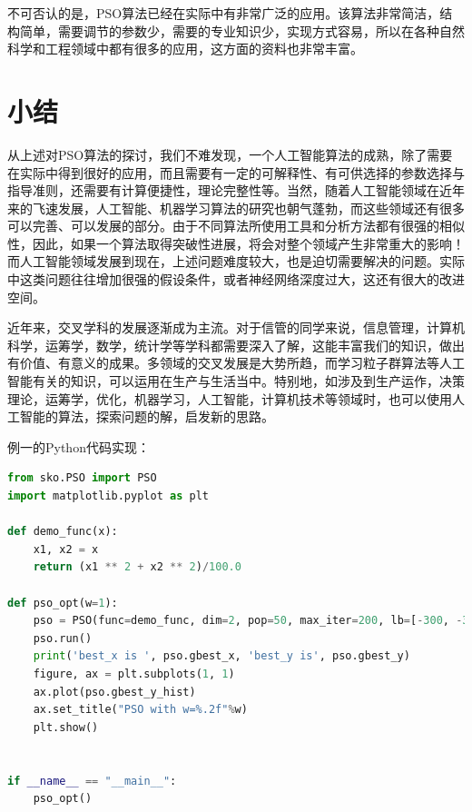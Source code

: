 \documentclass[lang=cn,12pt,a4paper,cite=authoryear]{elegantpaper}
\begin{document}
不可否认的是，PSO算法已经在实际中有非常广泛的应用。该算法非常简洁，结构简单，需要调节的参数少，需要的专业知识少，实现方式容易，所以在各种自然科学和工程领域中都有很多的应用，这方面的资料也非常丰富。

\section{小结}

从上述对PSO算法的探讨，我们不难发现，一个人工智能算法的成熟，除了需要在实际中得到很好的应用，而且需要有一定的可解释性、有可供选择的参数选择与指导准则，还需要有计算便捷性，理论完整性等。当然，随着人工智能领域在近年来的飞速发展，人工智能、机器学习算法的研究也朝气蓬勃，而这些领域还有很多可以完善、可以发展的部分。由于不同算法所使用工具和分析方法都有很强的相似性，因此，如果一个算法取得突破性进展，将会对整个领域产生非常重大的影响！而人工智能领域发展到现在，上述问题难度较大，也是迫切需要解决的问题。实际中这类问题往往增加很强的假设条件，或者神经网络深度过大，这还有很大的改进空间。

近年来，交叉学科的发展逐渐成为主流。对于信管的同学来说，信息管理，计算机科学，运筹学，数学，统计学等学科都需要深入了解，这能丰富我们的知识，做出有价值、有意义的成果。多领域的交叉发展是大势所趋，而学习粒子群算法等人工智能有关的知识，可以运用在生产与生活当中。特别地，如涉及到生产运作，决策理论，运筹学，优化，机器学习，人工智能，计算机技术等领域时，也可以使用人工智能的算法，探索问题的解，启发新的思路。




\newpage
\nocite{*}


\newpage
\appendix
\appendixpage
\addappheadtotoc

例一的Python代码实现：

\begin{lstlisting}[language=Python]
from sko.PSO import PSO
import matplotlib.pyplot as plt

def demo_func(x):
	x1, x2 = x
	return (x1 ** 2 + x2 ** 2)/100.0

def pso_opt(w=1):
	pso = PSO(func=demo_func, dim=2, pop=50, max_iter=200, lb=[-300, -300], ub=[300, 300], w=w, c1=0.5, c2=0.5)
	pso.run()
	print('best_x is ', pso.gbest_x, 'best_y is', pso.gbest_y)
	figure, ax = plt.subplots(1, 1)
	ax.plot(pso.gbest_y_hist)
	ax.set_title("PSO with w=%.2f"%w)
	plt.show()


if __name__ == "__main__":
	pso_opt()

\end{lstlisting}
\end{document}
